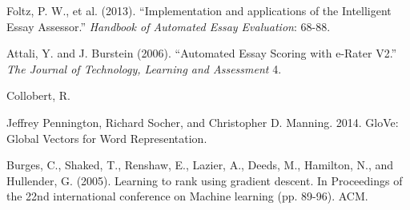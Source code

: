 \documentclass[10pt,psamsfonts]{amsart}
\theoremstyle{definition}
\theoremstyle{remark}
\numberwithin{equation}{section}
\begin{document}
\begin{thebibliography}{99}
Foltz, P. W., et al. (2013). ``Implementation and applications of the Intelligent Essay Assessor.'' {\em Handbook of Automated Essay Evaluation}: 68-88.

Attali, Y. and J. Burstein (2006). ``Automated Essay Scoring with e-Rater V2.'' {\em The Journal of Technology, Learning and Assessment} 4.

Collobert, R.

Jeffrey Pennington, Richard Socher, and Christopher D. Manning. 2014. GloVe: Global Vectors for Word Representation.

Burges, C., Shaked, T., Renshaw, E., Lazier, A., Deeds, M., Hamilton, N., and Hullender, G. (2005). Learning to rank using gradient descent. In Proceedings of the 22nd international conference on Machine learning (pp. 89-96). ACM.


\end{thebibliography}
\end{document}
